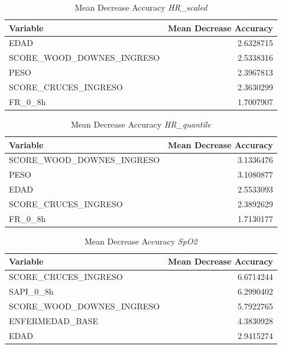 \begin{table}[H]
    \centering
    \begin{tabular}{lr}
        \toprule
        \textbf{Variable} & \textbf{Mean Decrease Accuracy} \\
        \midrule
        EDAD & 2.6328715 \\
        SCORE\_WOOD\_DOWNES\_INGRESO & 2.5338316 \\
        PESO & 2.3967813 \\
        SCORE\_CRUCES\_INGRESO & 2.3630299 \\
        FR\_0\_8h & 1.7007907 \\
        \bottomrule
    \end{tabular}
    \caption{Mean Decrease Accuracy \textit{HR\_scaled}}
\end{table}

\begin{table}[H]
    \centering
    \begin{tabular}{lr}
        \toprule
        \textbf{Variable} & \textbf{Mean Decrease Accuracy} \\
        \midrule
        SCORE\_WOOD\_DOWNES\_INGRESO & 3.1336476 \\
        PESO & 3.1080877 \\
        EDAD & 2.5533093 \\
        SCORE\_CRUCES\_INGRESO & 2.3892629 \\
        FR\_0\_8h & 1.7130177 \\
        \bottomrule
    \end{tabular}
    \caption{Mean Decrease Accuracy \textit{HR\_quantile}} 
\end{table}

\begin{table}[H]
    \centering
    \begin{tabular}{lr}
        \toprule
        \textbf{Variable} & \textbf{Mean Decrease Accuracy} \\
        \midrule
        SCORE\_CRUCES\_INGRESO & 6.6714244 \\
        SAPI\_0\_8h & 6.2990402 \\
        SCORE\_WOOD\_DOWNES\_INGRESO & 5.7922765 \\
        ENFERMEDAD\_BASE & 4.3830928 \\
        EDAD & 2.9415274 \\
        \bottomrule
    \end{tabular}
    \caption{Mean Decrease Accuracy \textit{SpO2}}
\end{table}

